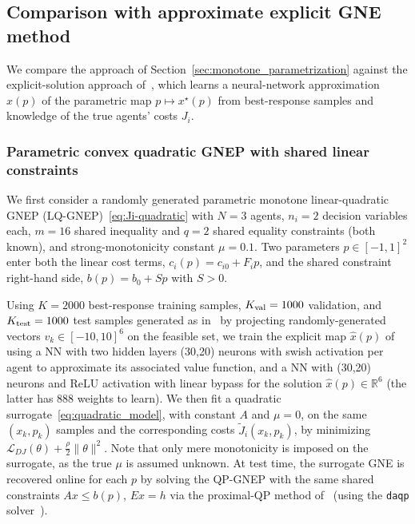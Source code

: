 \documentclass[11pt, a4paper]{article}
\newcommand{\rr}{\mathbb{R}}
\newcommand{\LL}{\mathcal{L}}
\theoremstyle{remark}
\theoremstyle{plain}
\begin{document}
\subsection{Comparison with approximate explicit GNE method}
We compare the approach of Section~\ref{sec:monotone_parametrization} against the explicit-solution approach of~\cite{BT26}, which learns a neural-network approximation $\hat x(p)$ of the parametric map $p\mapsto x^\star(p)$ from best-response samples and knowledge of the true agents' costs $J_i$. 

\subsubsection{Parametric convex quadratic GNEP with shared linear constraints}
We first consider a randomly generated parametric monotone linear-quadratic GNEP (LQ-GNEP)~\eqref{eq:Ji-quadratic} with $N=3$ agents, $n_i=2$ decision variables each, $m=16$ shared inequality and $q=2$ shared equality constraints (both known), and strong-monotonicity constant $\mu=0.1$. Two parameters $p\in[-1,1]^2$ enter both the linear cost terms, $c_i(p)=c_{i0}+F_ip$, and the shared constraint right-hand side, $b(p)=b_0+Sp$ with $S>0$.

Using $K=2000$ best-response training samples, $K_{\rm val}=1000$ validation, and $K_{\rm test}=1000$ test samples generated as in~\cite{BT26} by projecting randomly-generated vectors $v_k\in[-10,10]^6$ on the feasible set, we train the explicit map $\hat x(p)$ of~\cite{BT26} using a NN with two hidden layers (30,20) neurons with swish activation per agent to approximate its associated value function, and a NN with (30,20) neurons and ReLU activation with linear bypass for the solution $\hat x(p)\in\rr^6$ (the latter has 888 weights to learn). We then fit a quadratic surrogate~\eqref{eq:quadratic_model}, with constant $A$ and $\mu=0$, on the same $(x_k,p_k)$ samples and the corresponding costs $\tilde J_i(x_k,p_k)$, by minimizing $\LL_{DJ}(\theta)+\frac{\rho}{2}\|\theta\|^2$. Note that only mere monotonicity is imposed on the surrogate, as the true $\mu$ is assumed unknown. At test time, the surrogate GNE is recovered online for each $p$ by solving the QP-GNEP with the same shared constraints $Ax\leq b(p)$, $Ex=h$ via the proximal-QP method of~\cite{BT26b} (using the \texttt{daqp} solver~\cite{ABA22b}).
\end{document}
